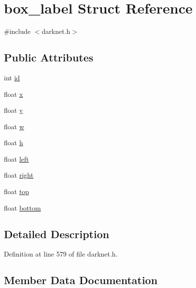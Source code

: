 \hypertarget{structbox__label}{}\section{box\+\_\+label Struct Reference}
\label{structbox__label}


{\ttfamily \#include $<$darknet.\+h$>$}

\subsection*{Public Attributes}
\begin{DoxyCompactItemize}
\item 
int \mbox{\hyperlink{structbox__label_a70328738c0d38547cd93d2fa59310a31}{id}}
\item 
float \mbox{\hyperlink{structbox__label_a50bbc824640977cfbd11b7d129c488d3}{x}}
\item 
float \mbox{\hyperlink{structbox__label_ae188dc93ed34cce2910afcd3b5e43730}{y}}
\item 
float \mbox{\hyperlink{structbox__label_ad866cd941fd0704a6ab79c068d3b2aff}{w}}
\item 
float \mbox{\hyperlink{structbox__label_a16f7c9ecdbd1919c153e7b3aa07f8d64}{h}}
\item 
float \mbox{\hyperlink{structbox__label_adbd27415d605f29a7022298fd615ed75}{left}}
\item 
float \mbox{\hyperlink{structbox__label_a4c7c88557656ba121f112021522b5837}{right}}
\item 
float \mbox{\hyperlink{structbox__label_a1f60ec698e94e15cc51a2d5d9e07126c}{top}}
\item 
float \mbox{\hyperlink{structbox__label_a284fc060d46feacdf929ec53dca7c643}{bottom}}
\end{DoxyCompactItemize}


\subsection{Detailed Description}


Definition at line 579 of file darknet.\+h.



\subsection{Member Data Documentation}
\mbox{\label{structbox__label_a284fc060d46feacdf929ec53dca7c643}} 

